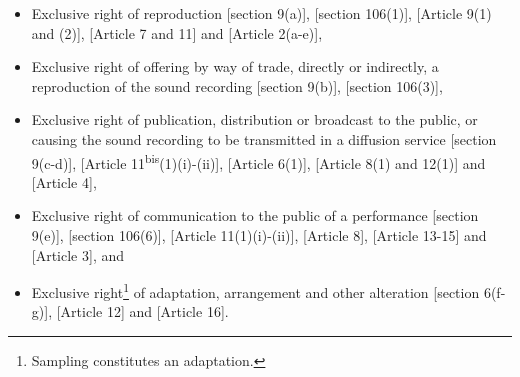 \documentclass[11pt]{article}
\begin{document}
\begin{itemize}
\item Exclusive right of reproduction [section 9(a)]\cite{rsa78_copyrightact},
[section 106(1)]\cite{usa76_title17_us_copyright_act}, [Article 9(1) and
(2)]\cite{wipo86_berne}, [Article 7 and 11]\cite{wipo96_wppt} and [Article
2(a-e)]\cite{eurlex01_harmonisation},

\item Exclusive right of offering by way of trade, directly or indirectly, a
reproduction of the sound recording [section 9(b)]\cite{rsa78_copyrightact}, [section 106(3)]\cite{usa76_title17_us_copyright_act},

\item Exclusive right of publication, distribution or broadcast to the public, or
causing the sound recording to be transmitted in a diffusion service [section
9(c-d)]\cite{rsa78_copyrightact}, [Article
11\textsuperscript{bis}(1)(i)-(ii)]\cite{wipo86_berne}, [Article
6(1)]\cite{wipo96_copyright_treaty}, [Article 8(1) and 12(1)]\cite{wipo96_wppt}
and [Article 4]\cite{eurlex01_harmonisation},

\item Exclusive right of communication to the public of a performance [section
9(e)]\cite{rsa78_copyrightact}, [section
106(6)]\cite{usa76_title17_us_copyright_act}, [Article
11(1)(i)-(ii)]\cite{wipo86_berne}, [Article 8]\cite{wipo96_copyright_treaty},
[Article 13-15]\cite{wipo96_wppt} and [Article 3]\cite{eurlex01_harmonisation},
and

\item Exclusive right\footnote{Sampling constitutes an adaptation.} of adaptation,
arrangement and other alteration [section 6(f-g)]\cite{rsa78_copyrightact},
[Article 12]\cite{wipo86_berne} and [Article 16]\cite{wipo96_wppt}.
\end{itemize}

\printbibliography
\end{document}
